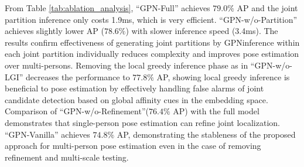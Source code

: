 \documentclass[10pt,twocolumn,letterpaper]{article}
\begin{document}
From  Table \ref{tab:ablation_analysis}, ``GPN-Full'' achieves  $79.0\%$ AP and the joint partition inference  only costs 1.9ms, which is very efficient. ``GPN-w/o-Partition'' achieves slightly lower AP ($78.6\%$)  with slower inference speed (3.4ms). The results confirm  effectiveness of generating joint partitions by  GPN\textemdash  inference within each joint partition individually reduces complexity and improves pose estimation  over multi-persons. Removing the local greedy inference phase as in ``GPN-w/o-LGI'' decreases the performance  to $77.8\%$ AP, showing local greedy inference is beneficial to pose estimation by effectively handling  false alarms of joint candidate detection based on global affinity cues in the embedding space. Comparison of ``GPN-w/o-Refinement''($76.4\%$ AP) with the full model  demonstrates that single-person pose estimation can refine  joint localization. ``GPN-Vanilla'' achieves $74.8\%$ AP, demonstrating the stableness of the proposed approach for multi-person pose estimation even in the case of removing  refinement and multi-scale testing.
\end{document}
